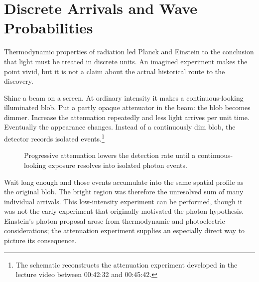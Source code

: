 \section{Discrete Arrivals and Wave Probabilities}

Thermodynamic properties of radiation led Planck and Einstein to the conclusion that light must be treated in discrete units. An imagined experiment makes the point vivid, but it is not a claim about the actual historical route to the discovery.

Shine a beam on a screen. At ordinary intensity it makes a continuous-looking illuminated blob. Put a partly opaque attenuator in the beam: the blob becomes dimmer. Increase the attenuation repeatedly and less light arrives per unit time. Eventually the appearance changes. Instead of a continuously dim blob, the detector records isolated events.\footnote{The schematic reconstructs the attenuation experiment developed in the lecture video between 00:42:32 and 00:45:42.}

\begin{figure}[h]
\centering
{}
\caption{Progressive attenuation lowers the detection rate until a continuous-looking exposure resolves into isolated photon events.}
\end{figure}

Wait long enough and those events accumulate into the same spatial profile as the original blob. The bright region was therefore the unresolved sum of many individual arrivals. This low-intensity experiment can be performed, though it was not the early experiment that originally motivated the photon hypothesis. Einstein's photon proposal arose from thermodynamic and photoelectric considerations; the attenuation experiment supplies an especially direct way to picture its consequence.

